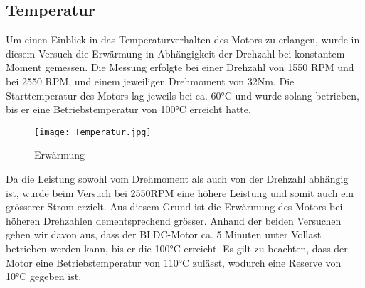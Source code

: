 \subsection{Temperatur}\label{subsec:Temperatur}
Um einen Einblick in das Temperaturverhalten des Motors zu erlangen, wurde in diesem Versuch die Erwärmung in Abhängigkeit der Drehzahl bei konstantem Moment gemessen. Die Messung erfolgte bei einer Drehzahl von 1550 RPM und bei 2550 RPM, und einem jeweiligen Drehmoment von 32Nm. Die Starttemperatur des Motors lag jeweils bei ca. 60°C und wurde solang betrieben, bis er eine Betriebstemperatur von 100°C erreicht hatte.


\begin{figure}[H]
	\centering
	\texttt{[image: Temperatur.jpg]}
	\caption{Erwärmung}\label{fig:Temperatur}
\end{figure}


Da die Leistung sowohl vom Drehmoment als auch von der Drehzahl abhängig ist, wurde beim Versuch bei 2550RPM eine höhere Leistung und somit auch ein grösserer Strom erzielt. Aus diesem Grund ist die Erwärmung des Motors bei höheren Drehzahlen dementsprechend grösser. Anhand der beiden Versuchen gehen wir davon aus, dass der BLDC-Motor ca. 5 Minuten unter Vollast betrieben werden kann, bis er die 100°C erreicht. Es gilt zu beachten, dass der Motor eine Betriebstemperatur von 110°C zulässt, wodurch eine Reserve von 10°C gegeben ist.
